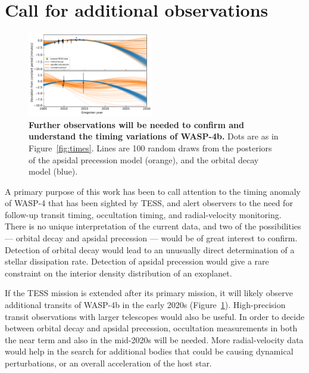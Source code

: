 \documentclass[12pt,twocolumn,tighten]{aastex62}
\begin{document}
\section{Call for additional observations}
\label{sec:future}

\begin{figure}[!t]
	\begin{center}
		\leavevmode
		\includegraphics[width=0.49\textwidth]{f6.pdf}
	\end{center}
  \vspace{-0.5cm}
	\caption{
    {\bf Further observations will be needed to confirm and understand
    the timing variations of WASP-4b.}
    Dots are as in Figure~\ref{fig:times}.  Lines are 100 random draws
    from the posteriors of the apsidal precession model (orange), and
    the orbital decay model (blue).    
		\label{fig:future}
	}
\end{figure}

A primary purpose of this work has been to call attention to the
timing anomaly of WASP-4 that has been sighted by TESS, and alert
observers to the need for follow-up transit timing, occultation
timing, and radial-velocity monitoring.  There is no unique
interpretation of the current data, and two of the possibilities ---
orbital decay and apsidal precession --- would be of great interest to
confirm. Detection of orbital decay would lead to an unusually direct
determination of a stellar dissipation rate. Detection of apsidal
precession would give a rare constraint on the interior density
distribution of an exoplanet.

If the TESS mission is extended after its primary mission, it will
likely observe additional transits of WASP-4b in the early 2020s
(Figure~\ref{fig:future}).  High-precision transit observations with
larger telescopes would also be useful.  In order to decide between
orbital decay and apsidal precession, occultation measurements in both
the near term and also in the mid-2020s will be needed.  More
radial-velocity data would help in the search for additional bodies
that could be causing dynamical perturbations, or an overall acceleration
of the host star.
\end{document}
